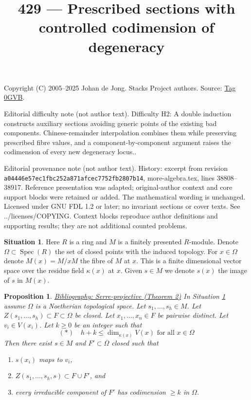 \documentclass{amsart}
\newenvironment{reference}{\comment}{\endcomment}
\theoremstyle{plain}
\newtheorem{proposition}[subsection]{Proposition}
\theoremstyle{definition}
\newtheorem{situation}[subsection]{Situation}
\theoremstyle{remark}
\numberwithin{equation}{subsection}
\def\Spec{\mathop{\mathrm{Spec}}}
\begin{document}
\title[Stacks Project, Tag 0GVB]{429 --- Prescribed sections with controlled codimension of degeneracy}
\maketitle
\noindent Copyright (C) 2005--2025 Johan de Jong. Stacks Project authors. Source: \href{https://stacks.math.columbia.edu/tag/0GVB}{Tag 0GVB}.

\noindent Editorial difficulty note (not author text). Difficulty H2: A double induction constructs auxiliary sections avoiding generic points of the existing bad components. Chinese-remainder interpolation combines them while preserving prescribed fibre values, and a component-by-component argument raises the codimension of every new degeneracy locus..

\noindent Editorial provenance note (not author text). History: excerpt from revision \texttt{a0444\allowbreak 6e57e\allowbreak c1fbc\allowbreak 252a8\allowbreak 71afc\allowbreak ec775\allowbreak 2fb28\allowbreak 07b14}, more-algebra.tex, lines 38808--38917. Reference presentation was adapted; original-author context and core support blocks were retained or added. The mathematical wording is unchanged. Licensed under GNU FDL 1.2 or later; no invariant sections or cover texts. See ../licenses/COPYING. Context blocks reproduce author definitions and supporting results; they are not additional counted problems.

\begin{situation}
\label{situation-splitting}
Here $R$ is a ring and $M$ is a finitely presented $R$-module.
Denote $\Omega \subset \Spec(R)$ the set of closed points
with the induced topology. For $x \in \Omega$ denote
$M(x) = M/xM$ the fibre of $M$ at $x$. This is a finite
dimensional vector space over the residue field $\kappa(x)$ at $x$.
Given $s \in M$ we denote $s(x)$ the image of $s$ in $M(x)$.
\end{situation}

\begin{proposition}
\label{proposition-splitting}
\begin{reference}
\href{https://stacks.math.columbia.edu/bibliography}{Bibliography: Serre-projective (Theorem 2)}
\end{reference}
In Situation \ref{situation-splitting} assume $\Omega$ is
a Noetherian topological space. Let $s_1, \ldots, s_h \in M$.
Let $Z(s_1, \ldots, s_h) \subset F \subset \Omega$ be closed.
Let $x_1, \ldots, x_n \in F$ be pairwise distinct.
Let $v_i  \in V(x_i)$.
Let $k \geq 0$ be an integer such that
$$
(*)\quad h + k \leq \dim_{\kappa(x)} V(x)\text{ for all }x \in \Omega
$$
Then there exist $s \in M$ and $F' \subset \Omega$ closed such that
\begin{enumerate}
\item[(a)] $s(x_i)$ maps to $v_i$,
\item[(b)] $Z(s_1, \ldots, s_h, s) \subset F \cup F'$, and
\item[(c)] every irreducible component of $F'$ has
codimension $\geq k$ in $\Omega$.
\end{enumerate}
\end{proposition}
\end{document}
